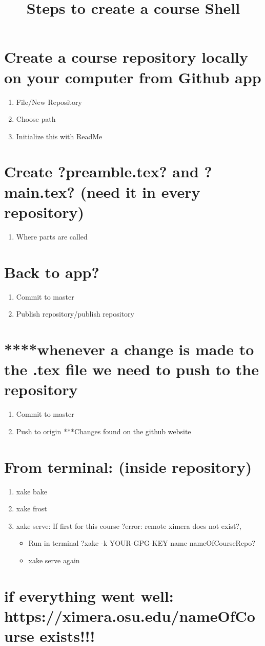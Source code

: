 \documentclass{ximera}
\title{Steps to create a course Shell }
\begin{document}
\begin{abstract}
\end{abstract}
\maketitle

\section{Create a course repository locally on your computer from Github app}
\begin{enumerate}
\item File/New Repository
\item	Choose path
\item Initialize this with ReadMe
\end{enumerate}

\section{Create ?preamble.tex? and ?main.tex? (need it in every repository)}
\begin{enumerate}
\item Where parts are called
\end{enumerate}

\section{Back to app?}
\begin{enumerate}
\item Commit to master
\item Publish repository/publish repository   
\end{enumerate}

\section{****whenever a change is made to the .tex file we need to push to the repository}
\begin{enumerate}
\item Commit to master
\item Push to origin ***Changes found on the github website
\end{enumerate}

\section{From terminal: (inside repository)}
\begin{enumerate}
\item xake bake
\item	xake frost
\item	xake serve: If first for this course ?error: remote ximera does not exist?,  
\begin{itemize}
\item Run in terminal ?xake -k YOUR-GPG-KEY name nameOfCourseRepo?
\item xake serve again
\end{itemize}
\end{enumerate}

\section{if everything went well: https://ximera.osu.edu/nameOfCourse exists!!!}
\end{document}
